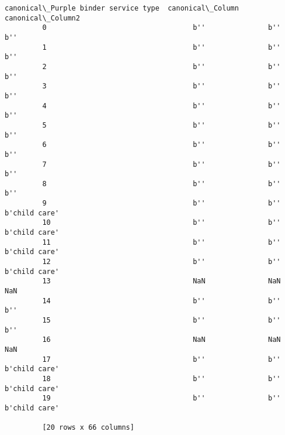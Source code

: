 \documentclass[11pt]{article}
\begin{document}
\begin{Verbatim}[commandchars=\\\{\}]
            canonical\_Purple binder service type  canonical\_Column  canonical\_Column2  
         0                                   b''               b''                b''  
         1                                   b''               b''                b''  
         2                                   b''               b''                b''  
         3                                   b''               b''                b''  
         4                                   b''               b''                b''  
         5                                   b''               b''                b''  
         6                                   b''               b''                b''  
         7                                   b''               b''                b''  
         8                                   b''               b''                b''  
         9                                   b''               b''      b'child care'  
         10                                  b''               b''      b'child care'  
         11                                  b''               b''      b'child care'  
         12                                  b''               b''      b'child care'  
         13                                  NaN               NaN                NaN  
         14                                  b''               b''                b''  
         15                                  b''               b''                b''  
         16                                  NaN               NaN                NaN  
         17                                  b''               b''      b'child care'  
         18                                  b''               b''      b'child care'  
         19                                  b''               b''      b'child care'  
         
         [20 rows x 66 columns]
\end{Verbatim}
            

    
    
    
    
\end{document}
